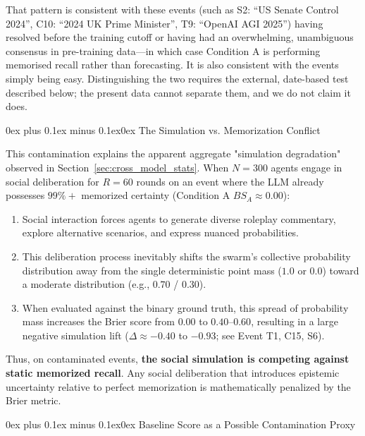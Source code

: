 \documentclass[11pt,journal,onecolumn]{IEEEtran}
\makeatletter
\renewcommand\subsubsection{\@startsection{subsubsection}{3}{\parindent}%
  {0ex plus 0.1ex minus 0.1ex}{0ex}%
  {\normalfont\normalsize\bfseries\itshape}}
\makeatother
\begin{document}
That pattern is consistent with these events (such as S2: ``US Senate Control 2024'', C10: ``2024 UK Prime Minister'', T9: ``OpenAI AGI 2025'') having resolved before the training cutoff or having had an overwhelming, unambiguous consensus in pre-training data---in which case Condition A is performing memorised recall rather than forecasting. It is also consistent with the events simply being easy. Distinguishing the two requires the external, date-based test described below; the present data cannot separate them, and we do not claim it does.

\subsubsection{The Simulation vs. Memorization Conflict}

This contamination explains the apparent aggregate "simulation degradation" observed in Section~\ref{sec:cross_model_stats}. When $N=300$ agents engage in social deliberation for $R=60$ rounds on an event where the LLM already possesses $99\%+$ memorized certainty (Condition A $BS_A \approx 0.00$):
\begin{enumerate}
    \item Social interaction forces agents to generate diverse roleplay commentary, explore alternative scenarios, and express nuanced probabilities.
    \item This deliberation process inevitably shifts the swarm's collective probability distribution away from the single deterministic point mass ($1.0$ or $0.0$) toward a moderate distribution (e.g., $0.70$ / $0.30$).
    \item When evaluated against the binary ground truth, this spread of probability mass increases the Brier score from $0.00$ to $0.40$--$0.60$, resulting in a large negative simulation lift ($\Delta \approx -0.40$ to $-0.93$; see Event T1, C15, S6).
\end{enumerate}

Thus, on contaminated events, \textbf{the social simulation is competing against static memorized recall}. Any social deliberation that introduces epistemic uncertainty relative to perfect memorization is mathematically penalized by the Brier metric.

\subsubsection{Baseline Score as a Possible Contamination Proxy}
\end{document}
